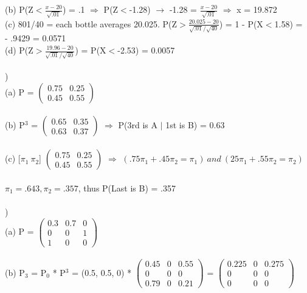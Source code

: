 \documentclass[12pt]{article}
\begin{document}
\indent (b) P(Z$<${\Large $\frac{x - 20}{\sqrt{.01}}$}) = .1 $\Rightarrow$ P(Z$<$-1.28) $\rightarrow$ -1.28 = {\Large $\frac{x - 20}{\sqrt{.01}}$} $\Rightarrow$ x = 19.872\\

\indent (c) 801/40 = each bottle averages 20.025. P(Z$>${\Large $\frac{20.025 - 20}{\sqrt{.01}/\sqrt{40}}$}) = 1 - P(X$<$1.58) = \\
\indent {} - .9429 = 0.0571\\

\indent (d) P(Z$>${\Large $\frac{19.96 - 20}{\sqrt{.01}/\sqrt{40}}$}) = P(X$<$-2.53) = 0.0057\\



\noindent \hrulefill \\


)\\
\indent (a) P = 
$\begin{pmatrix}
0.75 & 0.25\\
0.45 & 0.55
\end{pmatrix}$\\\\

\indent (b) P$^3$ = 
$\begin{pmatrix}
0.65 & 0.35\\
0.63 & 0.37
\end{pmatrix}$ $\Rightarrow$ P(3rd is A $|$ 1st is B) = 0.63\\\\

\indent (c)  [$\pi_1 \ \pi_2$]
$\begin{pmatrix}
0.75 & 0.25\\
0.45 & 0.55
\end{pmatrix}$ $\Rightarrow$ $(.75\pi_1 + .45\pi_2 = \pi_1)\ and\ (25\pi_1 + .55\pi_2 = \pi_2)$\\\\
\indent \indent $\pi_1 = .643, \pi_2 = .357$, thus P(Last is B) = .357\\


\noindent \hrulefill \\


)\\
\indent (a) P = $\begin{pmatrix}
0.3 & 0.7 & 0\\
0 & 0 & 1\\
1 & 0 & 0
\end{pmatrix}$\\\\

\indent (b) P$_3$ = P$_0$ * P$^3$ = 
(0.5, 0.5, 0) * 
$\begin{pmatrix}
0.45 & 0 &  0.55 \\
0 &  0  & 0   \\
0.79 & 0 &  0.21 
\end{pmatrix}$ = 
$\begin{pmatrix}
0.225 & 0 &  0.275 \\
0 &  0  & 0   \\
0 & 0 &  0 
\end{pmatrix}$\\\\
\end{document}
